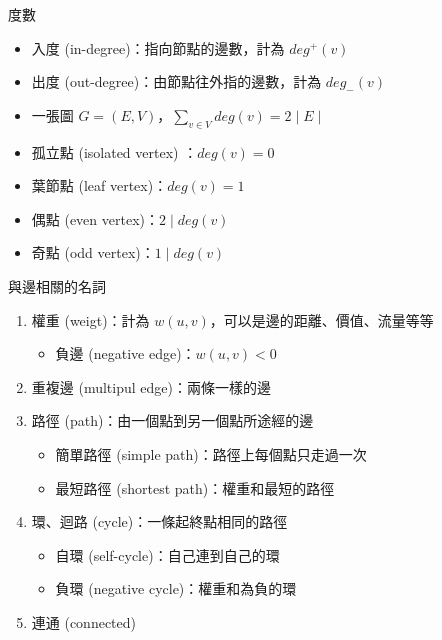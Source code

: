\documentclass[aspectratio=169]{beamer}
\begin{document}
    \begin{frame}{度數}
        \begin{itemize}
            \item<1-> 入度 (in-degree)：指向節點的邊數，計為 $deg^+(v)$
            \item<2-> 出度 (out-degree)：由節點往外指的邊數，計為 $deg_-(v)$
            \item<3-> 一張圖 $G = (E, V)$，$\displaystyle\sum_{v \in V}{deg(v)} = 2 \mid E \mid$
            \item<4-> 孤立點 (isolated vertex) ：$deg(v) = 0$
            \item<4-> 葉節點 (leaf vertex)：$deg(v) = 1$
            \item<5-> 偶點 (even vertex)：$2 \mid deg(v)$
            \item<5-> 奇點 (odd vertex)：$1 \mid deg(v)$
        \end{itemize}
    \end{frame}

    \begin{frame}{與邊相關的名詞}
        \begin{enumerate}
            \item 權重 (weigt)：計為 $w(u, v)$，可以是邊的距離、價值、流量等等
            \begin{itemize}
                \item 負邊 (negative edge)：$w(u, v) < 0$
            \end{itemize}
            \item 重複邊 (multipul edge)：兩條一樣的邊
            \item 路徑 (path)：由一個點到另一個點所途經的邊
            \begin{itemize}
                \item 簡單路徑 (simple path)：路徑上每個點只走過一次
                \item 最短路徑 (shortest path)：權重和最短的路徑
            \end{itemize}
            \item 環、迴路 (cycle)：一條起終點相同的路徑
            \begin{itemize}
                \item 自環 (self-cycle)：自己連到自己的環
                \item 負環 (negative cycle)：權重和為負的環
            \end{itemize}
            \item 連通 (connected)
        \end{enumerate}
    \end{frame}
\end{document}

